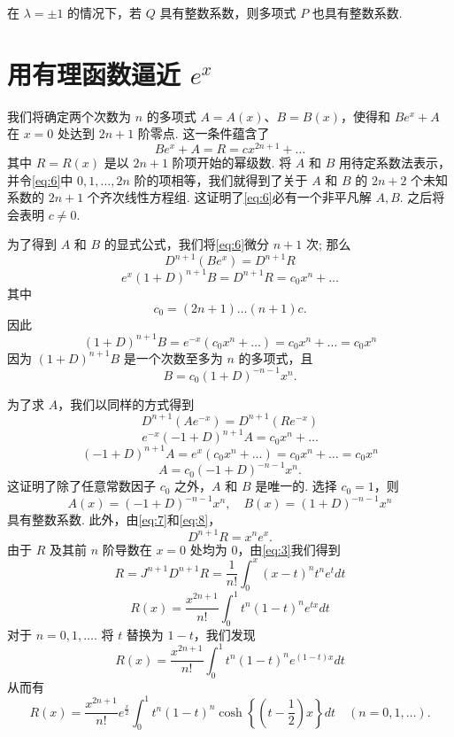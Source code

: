在 $\lambda = \pm 1$ 的情况下，若 $Q$ 具有整数系数，则多项式 $P$ 也具有整数系数.

\section{用有理函数逼近 $e^x$}

我们将确定两个次数为 $n$ 的多项式 $A = A(x)$、$B = B(x)$，使得和 $B e^x + A$ 在 $x = 0$ 处达到 $2n + 1$ 阶零点. 这一条件蕴含了
\begin{equation} B e^x + A = R = c x^{2n+1} + \dots \tag{6}\label{eq:6} \end{equation}
其中 $R = R(x)$ 是以 $2n+1$ 阶项开始的幂级数. 将 $A$ 和 $B$ 用待定系数法表示，并令\eqref{eq:6}中 $0, 1, \dots, 2n$ 阶的项相等，我们就得到了关于 $A$ 和 $B$ 的 $2n+2$ 个未知系数的 $2n+1$ 个齐次线性方程组. 这证明了\eqref{eq:6}必有一个非平凡解 $A, B$. 之后将会表明 $c \neq 0$.

为了得到 $A$ 和 $B$ 的显式公式，我们将\eqref{eq:6}微分 $n+1$ 次; 那么
\[ D^{n+1}(B e^x) = D^{n+1}R \]
\begin{equation} e^x(1+D)^{n+1}B = D^{n+1}R = c_0 x^n + \dots \tag{7}\label{eq:7} \end{equation}
其中
\[ c_0 = (2n+1) \dots (n+1)c. \]
因此
\begin{equation} (1+D)^{n+1}B = e^{-x}(c_0 x^n + \dots) = c_0 x^n + \dots = c_0 x^n \tag{8}\label{eq:8} \end{equation}
因为 $(1+D)^{n+1}B$ 是一个次数至多为 $n$ 的多项式，且
\[ B = c_0(1+D)^{-n-1}x^n. \]

为了求 $A$，我们以同样的方式得到
\[ D^{n+1}(A e^{-x}) = D^{n+1}(R e^{-x}) \]
\[ e^{-x}(-1+D)^{n+1}A = c_0 x^n + \dots \]
\[ (-1+D)^{n+1}A = e^x(c_0 x^n + \dots) = c_0 x^n + \dots = c_0 x^n \]
\[ A = c_0(-1+D)^{-n-1}x^n. \]
这证明了除了任意常数因子 $c_0$ 之外，$A$ 和 $B$ 是唯一的. 选择 $c_0 = 1$，则
\begin{equation} A(x) = (-1+D)^{-n-1}x^n, \quad B(x) = (1+D)^{-n-1}x^n \tag{9}\label{eq:9} \end{equation}
具有整数系数. 此外，由\eqref{eq:7}和\eqref{eq:8}，
\[ D^{n+1}R = x^n e^x. \]
由于 $R$ 及其前 $n$ 阶导数在 $x = 0$ 处均为 $0$，由\eqref{eq:3}我们得到
\[ R = J^{n+1}D^{n+1}R = \frac{1}{n!} \int_{0}^{x} (x-t)^{n}t^{n}e^{t}dt \]
\begin{equation} R(x) = \frac{x^{2n+1}}{n!} \int_0^1 t^n (1-t)^n e^{tx} dt \tag{10}\label{eq:10} \end{equation}
对于 $n=0,1,\dots$. 将 $t$ 替换为 $1-t$，我们发现
\[ R(x) = \frac{x^{2n+1}}{n!} \int_0^1 t^n (1-t)^n e^{(1-t)x} dt \]
从而有
\begin{equation} R(x) = \frac{x^{2n+1}}{n!} e^{\frac{x}{2}} \int_{0}^{1} t^{n} (1-t)^{n} \cosh\left\{\left(t-\frac{1}{2}\right)x\right\} dt \quad (n = 0, 1, \dots). \tag{11}\label{eq:11} \end{equation}

